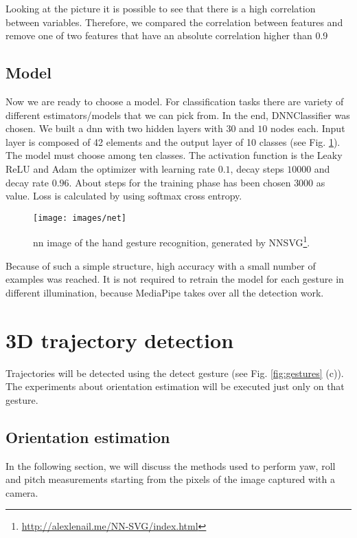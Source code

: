 \noindent Looking at the picture it is possible to see that there is a high correlation between variables. Therefore, we compared the correlation between features and remove one of two features that have an absolute correlation higher than 0.9

\subsection{Model}
\label{sec:model}
Now we are ready to choose a model. For classification tasks there are variety of different estimators/models that we can pick from. In the end, DNNClassifier was chosen. We built a \gls{dnn} with two hidden layers with $30$ and $10$ nodes each. Input layer is composed of 42 elements and the output layer of 10 classes (see Fig. \ref{fig:handarch}). The model must choose among ten classes. The activation function is the Leaky ReLU and Adam the optimizer with learning rate $0.1$, decay steps $10000$ and decay rate $0.96$. About steps for the training phase has been chosen $3000$ as value. Loss is calculated by using softmax cross entropy.

\begin{figure}[H]
	\begin{minipage}{\textwidth}
		\centering
		\texttt{[image: images/net]}
		\caption[Hand gesture reconognition \gls{nn}.] {\gls{nn} image of the hand gesture recognition, generated by NNSVG\footnote{\url{http://alexlenail.me/NN-SVG/index.html}}.}
		\label{fig:handarch}
	\end{minipage}
\end{figure}

\noindent Because of such a simple structure,  high accuracy with a small number of examples was reached. It is not required to retrain the model for each gesture in different illumination, because MediaPipe takes over all the detection work.

\section{3D trajectory detection}
\label{sec:3dtraj}
Trajectories will be detected using the detect gesture (see Fig. \ref{fig:gestures} (c)). The experiments about orientation estimation will be executed just only on that gesture. 

\subsection{Orientation estimation}
\label{sec:orientationestimation}
In the following section, we will discuss the methods used to perform yaw, roll and pitch measurements starting from the pixels of the image captured with a camera.

